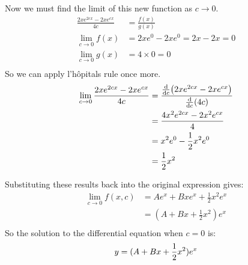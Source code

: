 \documentclass[10pt,\jkfside,a4paper]{article}
\begin{document}
\begin{enumerate}
\begin{enumerate}
\begin{equation}
\end{equation}
Now we must find the limit of this new function as $c \rightarrow 0$.
\begin{equation}
\begin{split}
\frac{2xe^{2cx} - 2xe^{cx}}{4c} &= \frac{f(x)}{g(x)}\\
\lim_{c \rightarrow 0} f(x) &= 2xe^0 - 2xe^0 = 2x - 2x = 0\\
\lim_{c \rightarrow 0} g(x) &= 4 \times 0 = 0\\
\end{split}
\end{equation}
So we can apply l'h\^opitals rule once more.
\begin{equation}
\begin{split}
\lim_{c \rightarrow 0} \frac{2xe^{2cx} - 2xe^{cx}}{4c} &= \frac{\dv{c}(2xe^{2cx} - 2xe^{cx})}{\dv{c}(4c)}\\
													   &= \frac{4x^2e^{2cx} - 2x^2e^{cx}}{4}\\
													   &= x^2e^{0} - \frac{1}{2}x^2e^0\\
													   &= \frac{1}{2}x^2\\
\end{split}
\end{equation}

Substituting these results back into the original expression gives:
\begin{equation}
\begin{split}
\lim_{c \rightarrow 0} f(x, c) &= Ae^x + Bxe^x + \frac{1}{2}x^2e^x\\
							   &= (A + Bx + \frac{1}{2}x^2)e^x\\
\end{split}
\end{equation}
So the solution to the differential equation when $c = 0$ is:
\begin{equation}
y = (A + Bx + \frac{1}{2}x^2)e^x\\
\end{equation}

\end{enumerate}


\end{enumerate}
\end{document}
